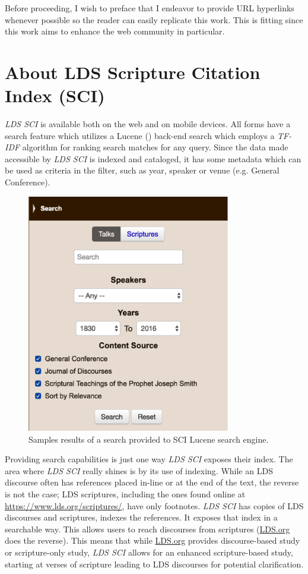 Before proceeding, I wish to preface that I endeavor to provide URL hyperlinks whenever possible so the reader can easily replicate this work. This is fitting since this work aims to enhance the web community in particular.

\section{About LDS Scripture Citation Index (SCI)}
\emph{LDS SCI} is available both on the web and on mobile devices. All forms have a search feature which utilizes a Lucene (\citealp{lucene:luke}) back-end search which employs a \emph{TF-IDF} algorithm for ranking search matches for any query. Since the data made accessible by \emph{LDS SCI} is indexed and cataloged, it has some metadata which can be used as criteria in the filter, such as year, speaker or venue (e.g. General Conference).

\begin{figure}[hhhhhtb]
	\centering
		\includegraphics[width=3.5in,natwidth=310,natheight=442]{figures/sci_search.png}
		\caption[SCI \emph{TF-IDF} Search Results]{
			Samples results of a search provided to SCI Lucene search engine.
		}
	\label{fig:sci_search}
\end{figure}

Providing search capabilities is just one way \emph{LDS SCI} exposes their index. The area where \emph{LDS SCI} really shines is by its use of indexing. While an LDS discourse often has references placed in-line or at the end of the text, the reverse is not the case; LDS scriptures, including the ones found online at \url{https://www.lds.org/scriptures/}, have only footnotes. \emph{LDS SCI} has copies of LDS discourses and scriptures, indexes the references. It exposes that index in a searchable way. This allows users to reach discourses from scriptures (\url{LDS.org} does the reverse). This means that while \url{LDS.org} provides discourse-based study or scripture-only study, \emph{LDS SCI} allows for an enhanced scripture-based study, starting at verses of scripture leading to LDS discourses for potential clarification.

